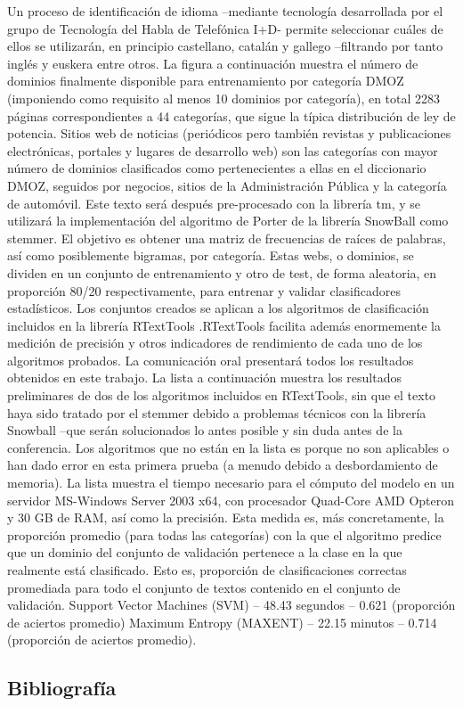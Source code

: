 Un proceso de identificación de idioma –mediante tecnología desarrollada por el grupo de Tecnología del Habla de Telefónica I+D- permite seleccionar cuáles de ellos se utilizarán, en principio castellano, catalán y gallego –filtrando por tanto inglés y euskera entre otros. La figura a continuación muestra el número de dominios finalmente disponible para entrenamiento por categoría DMOZ (imponiendo como requisito al menos 10 dominios por categoría), en total 2283 páginas correspondientes a 44 categorías, que sigue la típica  distribución de ley de potencia. Sitios web de noticias (periódicos pero también revistas y publicaciones electrónicas, portales y lugares de desarrollo web) son las categorías con mayor  número de dominios clasificados como pertenecientes a ellas en el diccionario DMOZ, seguidos por negocios, sitios de la Administración Pública y la categoría de automóvil.
Este texto será después pre-procesado con la librería tm, y se utilizará la implementación del algoritmo de Porter de la librería SnowBall como stemmer. El objetivo es obtener una matriz de frecuencias de raíces de palabras, así como posiblemente bigramas, por categoría.
Estas webs, o dominios, se dividen en un conjunto de entrenamiento y otro de test, de forma aleatoria, en proporción 80/20 respectivamente, para entrenar y validar clasificadores estadísticos.
Los conjuntos creados se aplican a los algoritmos de clasificación incluidos en la librería RTextTools .RTextTools facilita además enormemente la medición de precisión y otros indicadores de rendimiento de cada uno de los algoritmos probados. La comunicación oral presentará todos los resultados obtenidos en este trabajo. 
La lista a continuación muestra los resultados preliminares de dos de los algoritmos incluidos en RTextTools, sin que el texto haya sido tratado por el stemmer debido a problemas técnicos con la librería Snowball –que serán solucionados lo antes posible y sin duda antes de la conferencia. 
Los algoritmos que no están en la lista es porque no son aplicables o han dado error en esta primera prueba (a menudo debido a desbordamiento de memoria). La lista muestra el tiempo necesario para el cómputo del modelo en un servidor MS-Windows Server 2003 x64, con procesador Quad-Core AMD Opteron y 30 GB de RAM, así como la precisión. Esta medida es, más concretamente, la proporción promedio (para todas las categorías) con la que el algoritmo predice que un dominio del conjunto de validación pertenece a la clase en la que realmente está clasificado. Esto es, proporción de clasificaciones correctas promediada para todo el conjunto de textos contenido en el conjunto de validación. 
Support Vector Machines (SVM) – 48.43 segundos – 0.621 (proporción de aciertos promedio)
Maximum Entropy (MAXENT) – 22.15 minutos – 0.714 (proporción de aciertos promedio). \bigskip\subsection*{Bibliografía}

